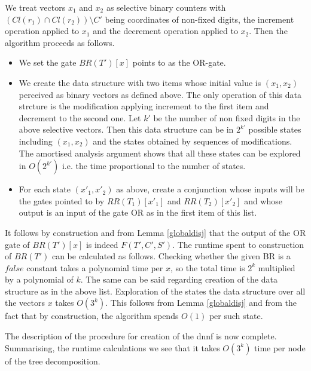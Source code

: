 \documentclass{llncs}
\begin{document}
We treat vectors $x_1$ and $x_2$ as selective binary counters with $(Cl(r_1) \cap Cl(r_2)) \setminus C'$ being
coordinates of non-fixed digits, the increment operation applied to $x_1$ and the decrement operation applied to $x_2$.
Then the algorithm proceeds as follows.
\begin{itemize}
\item We set the gate $BR(T')[x]$ points to as the OR-gate.
\item We create the data structure with two items whose initial value is $(x_1,x_2)$ perceived as
      binary vectors as defined above. The only operation of this data strcture is the modification
      applying increment to the first item and decrement to the second one.
      Let $k'$ be the number of non fixed digits in the above selective vectors.
      Then this data structure can be in $2^{k'}$ possible states including $(x_1,x_2)$ and the states obtained
      by sequences of modifications. The amortised analysis argument shows that all these states can be
      explored in $O(2^{k'})$ i.e. the time proportional to the number of states.
\item For each state $(x'_1,x'_2)$ as above, create a conjunction whose inputs will be the gates
      pointed to by $RR(T_1)[x'_1]$ and $RR(T_2)[x'_2]$ and whose output is an input of the gate OR
      as in the first item of this list.       
\end{itemize} 
It follows by construction and from Lemma \ref{globaldisj} that the output of the OR gate of $BR(T')[x]$
is indeed $F(T',C',S')$. The runtime spent to construction of $BR(T')$ can be calculated as follows.
Checking whether the given BR is a $false$ constant takes a polynomial time per $x$, so the total time 
is $2^k$ multiplied by a polynomial
of $k$. The same can be said regarding creation of the data structure as in the above list. 
Exploration of the states the data structure over all the vectors $x$ takes $O(3^k)$. This follows from
Lemma \ref{globaldisj} and from the fact that by construction, the algorithm spends $O(1)$ per such state.

The description of the procedure for creation of the {\sc dnnf} is now complete. Summarising, the runtime
calculations we see that it takes $O(3^k)$ time per node of the tree decomposition.
\end{document}
